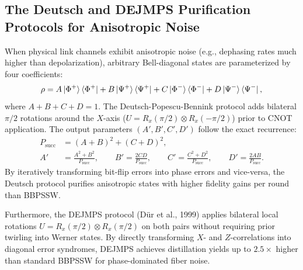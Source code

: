 \subsection{The Deutsch and DEJMPS Purification Protocols for Anisotropic Noise}
When physical link channels exhibit anisotropic noise (e.g., dephasing rates much higher than depolarization), arbitrary Bell-diagonal states are parameterized by four coefficients:
\begin{equation}
    \rho = A \ket{\Phi^+}\bra{\Phi^+} + B \ket{\Psi^+}\bra{\Psi^+} + C \ket{\Phi^-}\bra{\Phi^-} + D \ket{\Psi^-}\bra{\Psi^-},
\end{equation}
where $A + B + C + D = 1$. The Deutsch-Popescu-Bennink protocol adds bilateral $\pi/2$ rotations around the $X$-axis ($U = R_x(\pi/2) \otimes R_x(-\pi/2)$) prior to CNOT application. The output parameters $(A', B', C', D')$ follow the exact recurrence:
\begin{align}
    P_{\text{succ}} &= (A + B)^2 + (C + D)^2, \\
    A' &= \frac{A^2 + B^2}{P_{\text{succ}}}, \qquad B' = \frac{2CD}{P_{\text{succ}}}, \qquad C' = \frac{C^2 + D^2}{P_{\text{succ}}}, \qquad D' = \frac{2AB}{P_{\text{succ}}}.
\end{align}
By iteratively transforming bit-flip errors into phase errors and vice-versa, the Deutsch protocol purifies anisotropic states with higher fidelity gains per round than BBPSSW.

Furthermore, the DEJMPS protocol (D\"ur et al., 1999) applies bilateral local rotations $U = R_x(\pi/2) \otimes R_x(\pi/2)$ on both pairs without requiring prior twirling into Werner states. By directly transforming $X$- and $Z$-correlations into diagonal error syndromes, DEJMPS achieves distillation yields up to $2.5\times$ higher than standard BBPSSW for phase-dominated fiber noise.

